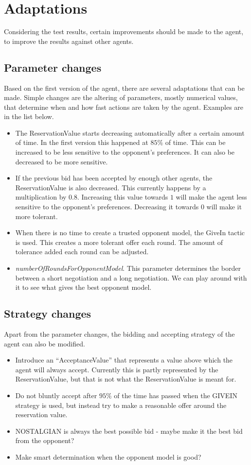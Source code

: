 \section{Adaptations}
Considering the test results, certain improvements should be made to the agent, to improve the results against other agents.

\subsection{Parameter changes}
Based on the first version of the agent, there are several adaptations that can be made. Simple changes are the altering of parameters, mostly numerical values, that determine when and how fast actions are taken by the agent. Examples are in the list below.

\begin{itemize}
\item The ReservationValue starts decreasing automatically after a certain amount of time. In the first version this happened at $85\%$ of time. This can be increased to be less sensitive to the opponent's preferences. It can also be decreased to be more sensitive.
\item If the previous bid has been accepted by enough other agents, the ReservationValue is also decreased. This currently happens by a multiplication by $0.8$. Increasing this value towards $1$ will make the agent less sensitive to the opponent's preferences. Decreasing it towards $0$ will make it more tolerant.
\item When there is no time to create a trusted opponent model, the GiveIn tactic is used. This creates a more tolerant offer each round. The amount of tolerance added each round can be adjusted.
\item \emph{numberOfRoundsForOpponentModel}. This parameter determines the border between a short negotiation and a long negotiation. We can play around with it to see what gives the best opponent model.
\end{itemize}


\subsection{Strategy changes}
Apart from the parameter changes, the bidding and accepting strategy of the agent can also be modified. 
 
\begin{itemize}
\item Introduce an ``AcceptanceValue'' that represents a value above which the agent will always accept. Currently this is partly represented by the ReservationValue, but that is not what the ReservationValue is meant for.
\item Do not bluntly accept after $95\%$ of the time has passed when the GIVEIN strategy is used, but instead try to make a reasonable offer around the reservation value.
\item NOSTALGIAN is always the best possible bid - maybe make it the best bid from the opponent?
\item Make smart determination when the opponent model is good?
\end{itemize}